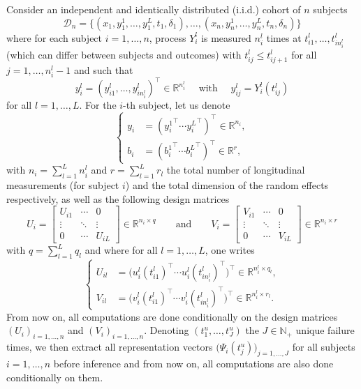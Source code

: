 \documentclass[11pt]{article}
\newcommand{\cD}{\mathcal D}
\newcommand{\R}{\mathds R}
\newcommand{\N}{\mathds N}
\begin{document}
Consider an independent and identically distributed (i.i.d.) cohort of $n$ subjects
\[ \cD_n = \big\{ (x_1, y_1^1, \ldots, y_1^L, t_1, \delta_1), \ldots, (x_n, y_n^1, \ldots, y_n^L, t_n, \delta_n) \big\} \]
where for each subject $i=1, \ldots, n$, process $Y_i^l$ is measured $n_i^l$ times at $t_{i1}^l, \ldots, t_{in_i^l}^l$ (which can differ between subjects and outcomes) with $t_{ij}^l \leq t_{ij+1}^l$ for all $j=1, \ldots, n_i^l-1$ and such that
\[ y_i^l=(y_{i1}^l, \ldots, y_{in_i^l}^l)^\top \in \R^{n_i^l} \quad \text{ with } \quad y_{ij}^l=Y_i^l(t_{ij}^l) \]
for all $l=1, \ldots, L$. 
For the $i$-th subject, let us denote 
\[
\left\{
    \begin{array}{ll}
        y_i &= ({y_i^1}^\top \cdots {y_i^L}^\top)^\top \in \R^{n_i},\\
        b_i &= ({b_i^1}^\top \cdots {b_i^L}^\top)^\top \in \R^r,
    \end{array}
\right.
\]
with $n_i = \sum_{l=1}^L n_i^l$ and $r = \sum_{l=1}^L r_l$ the total number of longitudinal measurements (for subject $i$) and the total dimension of the random effects respectively, as well as the following design matrices
\[ U_i = 
\begin{bmatrix}
  U_{i1} & \cdots & 0\\
  \vdots &  \ddots & \vdots \\
  0 & \cdots & U_{iL}
\end{bmatrix} 
\in \R^{n_i \times q}
\qquad \text{and} \qquad
V_i = 
\begin{bmatrix}
  V_{i1} & \cdots & 0\\
  \vdots &  \ddots & \vdots \\
  0 & \cdots & V_{iL}
\end{bmatrix}
\in \R^{n_i \times r}
\]
with $q = \sum_{l=1}^L q_l$ and where for all $l=1, \ldots, L$, one writes
\[
\left\{
    \begin{array}{ll}
        U_{il} &= \big(u_i^l(t_{i1}^l)^\top \cdots u_i^l(t_{in_i^l}^l)^\top\big)^\top \in \R^{n_i^l \times q_l},\\
        V_{il} &= \big(v_i^l(t_{i1}^l)^\top \cdots v_i^l(t_{in_i^l}^l)^\top\big)^\top \in \R^{n_i^l \times r_l}.
    \end{array}
\right.
\]
From now on, all computations are done conditionally on the design matrices $(U_i)_{i=1, \dots, n}$ and $(V_i)_{i=1, \dots, n}$.
Denoting $(t_1^u, \ldots, t_J^u)$ the $J \in \N_+$ unique failure times, we then extract all representation vectors $\big(\Psi_i(t_j^u)\big)_{j=1,\ldots,J}$ for all subjects $i=1, \dots, n$ before inference and from now on, all computations are also done conditionally on them.
\end{document}
